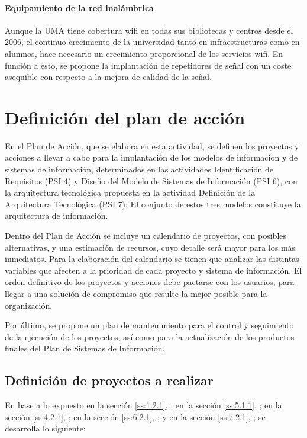 \documentclass[11pt,a4paper,spanish,twoside]{book}
\begin{document}
\subsubsection{Equipamiento de la red inalámbrica}
Aunque la UMA tiene cobertura wifi en todas sus bibliotecas y centros desde
el 2006, el continuo crecimiento de la universidad tanto en infraestructuras
como en alumnos, hace necesario un crecimiento proporcional de los servicios
wifi. En función a esto, se propone la implantación de repetidores de señal
con un coste asequible con respecto a la mejora de calidad de la señal.


\chapter{Definición del plan de acción}
En el Plan de Acción, que se elabora en esta actividad, se definen los
proyectos y acciones a llevar a cabo para la implantación de los modelos de
información y de sistemas de información, determinados en las actividades
Identificación de Requisitos (PSI 4) y Diseño del Modelo de Sistemas de
Información (PSI 6), con la arquitectura tecnológica propuesta en la
actividad Definición de la Arquitectura Tecnológica (PSI 7). El conjunto de
estos tres modelos constituye la arquitectura de información. 

Dentro del Plan de Acción se incluye un calendario de proyectos, con posibles 
alternativas, y una estimación de recursos, cuyo detalle será mayor para los 
más inmediatos. Para la elaboración del calendario se tienen que analizar las
distintas variables que afecten a la prioridad de cada proyecto y sistema de
información. El orden definitivo de los proyectos y acciones debe pactarse
con los usuarios, para llegar a una solución de compromiso que resulte la
mejor posible para la organización. 

Por último, se propone un plan de mantenimiento para el control y seguimiento 
de la ejecución de los proyectos, así como para la actualización de los 
productos finales del Plan de Sistemas de Información. 

\section{Definición de proyectos a realizar}
En base a lo expuesto 
en la sección \vref{ss:1.2.1}, \emph{}; 
en la sección \vref{ss:5.1.1}, \emph{}; 
en la sección \vref{ss:4.2.1}, \emph{}; 
en la sección \vref{ss:6.2.1}, \emph{}; y
en la sección \vref{ss:7.2.1}, \emph{}; 
se desarrolla lo siguiente:
\end{document}
